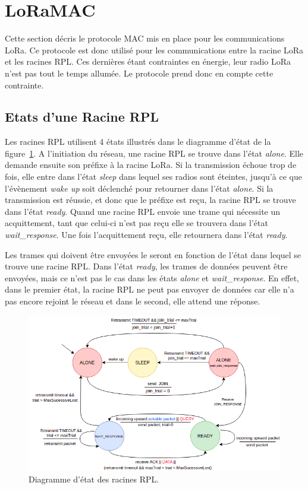 \section{LoRaMAC}\label{sec:archi-loramac:proto}
\renewcommand{\rightmark}{LoRaMac}

    Cette section décris le protocole MAC mis en place pour les communications LoRa. Ce protocole est donc utilisé pour les communications entre la racine LoRa et les racines RPL. Ces dernières étant contraintes en énergie, leur radio LoRa n'est pas tout le temps allumée. Le protocole prend donc en compte cette contrainte.

\subsection*{Etats d'une Racine RPL}
    Les racines RPL utilisent 4 états illustrés dans le diagramme d'état de la figure~\ref{fig:archi-state}. A l'initiation du réseau, une racine RPL se trouve dans l'état \textit{alone}. Elle demande ensuite son préfixe à la racine LoRa. Si la transmission échoue trop de fois, elle entre dans l'état \textit{sleep} dans lequel ses radios sont éteintes, jusqu'à ce que l'évènement \textit{wake up} soit déclenché pour retourner dans l'état \textit{alone}. Si la transmission est réussie, et donc que le préfixe est reçu, la racine RPL se trouve dans l'état \textit{ready}. Quand une racine RPL envoie une trame qui nécessite un acquittement, tant que celui-ci n'est pas reçu elle se trouvera dans l'état \textit{wait\_response}. Une fois l'acquittement reçu, elle retournera dans l'état \textit{ready}.
    
    Les trames qui doivent être envoyées le seront en fonction de l'état dans lequel se trouve une racine RPL. Dans l'état \textit{ready}, les trames de données peuvent être envoyées, mais ce n'est pas le cas dans les états \textit{alone} et \textit{wait\_response}. En effet, dans le premier état, la racine RPL ne peut pas envoyer de données car elle n'a pas encore rejoint le réseau et dans le second, elle attend une réponse.
    \begin{figure}[H]
        \centering
        \includegraphics[scale=0.5]{res/pictures/loramac-state.drawio.png}
        \caption{Diagramme d'état des racines RPL.}
        \label{fig:archi-state}
    \end{figure}

